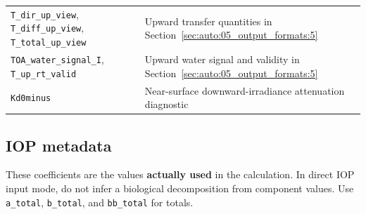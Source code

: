 {\begin{longtable}{@{}>{\raggedright\arraybackslash}p{}>{\raggedright\arraybackslash}p{}@{}}
\texttt{T\_\allowbreak{}dir\_\allowbreak{}up\_\allowbreak{}view}, \texttt{T\_\allowbreak{}diff\_\allowbreak{}up\_\allowbreak{}view}, \texttt{T\_\allowbreak{}total\_\allowbreak{}up\_\allowbreak{}view} & Upward transfer quantities in Section~\ref{sec:auto:05_output_formats:5} \\
\texttt{TOA\_\allowbreak{}water\_\allowbreak{}signal\_\allowbreak{}I}, \texttt{T\_\allowbreak{}up\_\allowbreak{}rt\_\allowbreak{}valid} & Upward water signal and validity in Section~\ref{sec:auto:05_output_formats:5} \\
\texttt{Kd0minus} & Near-surface downward-irradiance attenuation diagnostic \\
\end{longtable}
}

\subsection{IOP metadata}
\label{sec:auto:05_output_formats:7.3}
These coefficients are the values \textbf{actually used} in the calculation. In direct IOP input mode, do not infer a biological decomposition from component values. Use \texttt{a\_\allowbreak{}total}, \texttt{b\_\allowbreak{}total}, and \texttt{bb\_\allowbreak{}total} for totals.



